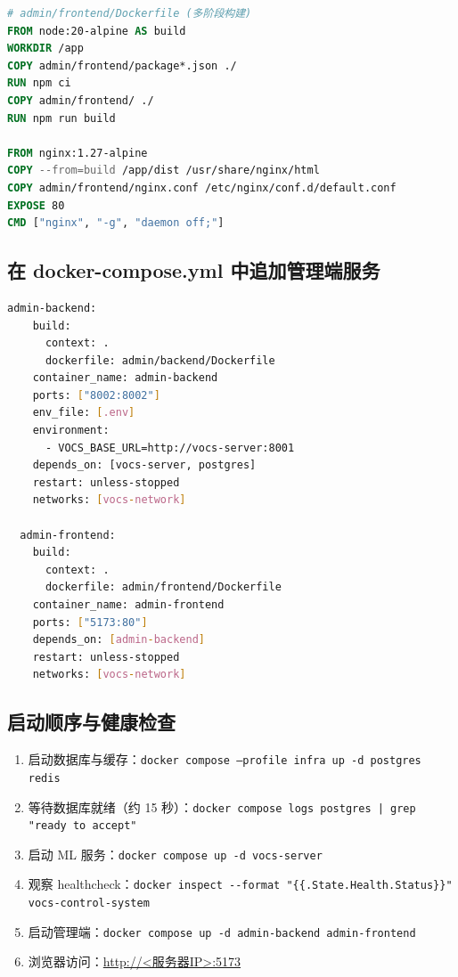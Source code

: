 \documentclass[UTF8,a4paper,11pt]{ctexart}
\begin{document}
\begin{lstlisting}[language=dockerfile]
# admin/frontend/Dockerfile (多阶段构建)
FROM node:20-alpine AS build
WORKDIR /app
COPY admin/frontend/package*.json ./
RUN npm ci
COPY admin/frontend/ ./
RUN npm run build

FROM nginx:1.27-alpine
COPY --from=build /app/dist /usr/share/nginx/html
COPY admin/frontend/nginx.conf /etc/nginx/conf.d/default.conf
EXPOSE 80
CMD ["nginx", "-g", "daemon off;"]
\end{lstlisting}

\subsection{在 docker-compose.yml 中追加管理端服务}

\begin{lstlisting}[language=bash]
  admin-backend:
    build:
      context: .
      dockerfile: admin/backend/Dockerfile
    container_name: admin-backend
    ports: ["8002:8002"]
    env_file: [.env]
    environment:
      - VOCS_BASE_URL=http://vocs-server:8001
    depends_on: [vocs-server, postgres]
    restart: unless-stopped
    networks: [vocs-network]

  admin-frontend:
    build:
      context: .
      dockerfile: admin/frontend/Dockerfile
    container_name: admin-frontend
    ports: ["5173:80"]
    depends_on: [admin-backend]
    restart: unless-stopped
    networks: [vocs-network]
\end{lstlisting}

\subsection{启动顺序与健康检查}

\begin{enumerate}[leftmargin=1.6em]
  \item 启动数据库与缓存：\texttt{docker compose --profile infra up -d postgres redis}
  \item 等待数据库就绪（约 15 秒）：\texttt{docker compose logs postgres | grep "ready to accept"}
  \item 启动 ML 服务：\texttt{docker compose up -d vocs-server}
  \item 观察 healthcheck：\texttt{docker inspect -{}-format "\{\{.State.Health.Status\}\}" vocs-control-system}
  \item 启动管理端：\texttt{docker compose up -d admin-backend admin-frontend}
  \item 浏览器访问：\url{http://<服务器IP>:5173}
\end{enumerate}
\end{document}
